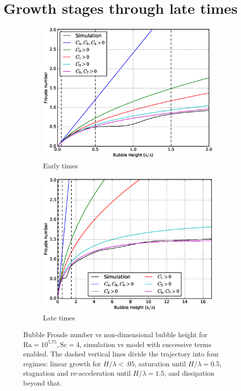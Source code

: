 \section{Growth stages through late times} 

\begin{figure}
\begin{subfigure}[b]{\columnwidth}
\includegraphics[width=\columnwidth]{figs/Cascade-short-4-1}
\caption{Early times}
\end{subfigure}
\begin{subfigure}[b]{\columnwidth}
\includegraphics[width=\columnwidth]{figs/Cascade-4-1}
\caption{Late times}
\end{subfigure}
\caption{ 
Bubble Froude number vs non-dimensional bubble height for $\text{Ra} = 10^{5.75}, \text{Sc} = 4$, simulation vs model with successive terms enabled.
The dashed vertical lines divide the trajectory into four regimes: linear growth for $H/\lambda < .05$, saturation until $H / \lambda = 0.5$, stagnation and re-acceleration until $H / \lambda = 1.5$, and dissipation beyond that.
}
\end{figure}

